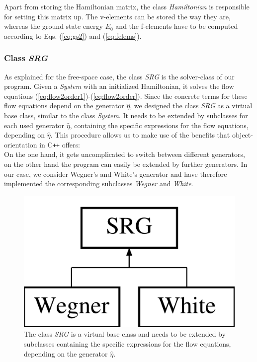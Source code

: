 Apart from storing the Hamiltonian matrix, the class \textit{Hamiltonian} is responsible for setting this matrix up. The v-elements can be stored the way they are, whereas the ground state energy $E_0$ and the f-elements have to be computed according to Eqs. (\ref{eq:gs2}) and (\ref{eq:felems}). 

\subsubsection{Class \textit{SRG}}
As explained for the free-space case, the class \textit{SRG} is the solver-class of our program.
 Given a \textit{System} with an initialized Hamiltonian, it solves the flow equations (\ref{eq:flow2order1})-(\ref{eq:flow2order}). Since the concrete terms for these flow equations depend on the generator $\hat{\eta}$, we designed the class \textit{SRG} as a virtual base class, similar to the class \textit{System}. It needs to be extended by subclasses for each used generator $\hat{\eta}$, containing the specific expressions for the flow equations, depending on $\hat{\eta}$. This procedure allows us to make use of the benefits that object-orientation in C{}\verb!++! offers: \\
 On the one hand, it gets uncomplicated to switch between different generators, on the other hand the program can easily be extended by further generators. In our case, we consider Wegner's and White's generator and have therefore implemented the corresponding subclasses \textit{Wegner} and \textit{White}.
  
\begin{figure}
\begin{center}
\includegraphics[scale=0.2]{../Plots/classSRG.pdf}
\caption{The class \textit{SRG} is a virtual  base class and needs to be extended by subclasses containing the specific expressions for the flow equations, depending on the generator $\hat{\eta}$.}
\label{fig:classSRG}
\end{center}
\end{figure}

